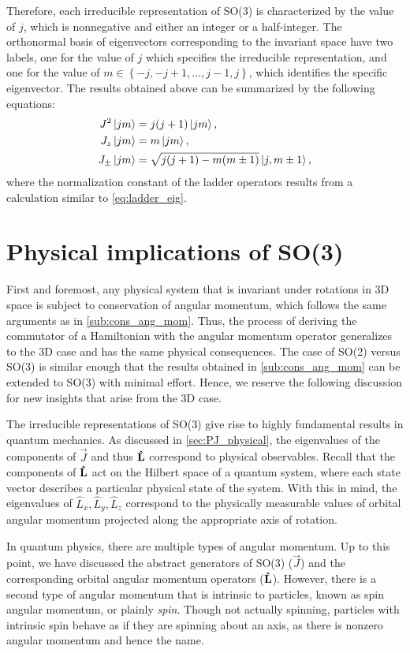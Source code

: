 Therefore, each irreducible representation of SO(3) is characterized by the value of $j$, which is nonnegative and either an integer or a half-integer. The orthonormal basis of eigenvectors corresponding to the invariant space have two labels, one for the value of $j$ which specifies the irreducible representation, and one for the value of $m\in\left\{ -j,-j+1,\dots,j-1,j \right\}$, which identifies the specific eigenvector. The results obtained above can be summarized by the following equations:
\begin{align}
    J^2\ket{jm} &= j(j+1)\ket{jm}, \\
    J_z\ket{jm} &= m\ket{jm}, \\
    J_\pm\ket{jm} &= \sqrt{j(j+1)-m(m\pm 1)}\ket{j,m\pm 1},
\end{align}
where the normalization constant of the ladder operators results from a calculation similar to \cref{eq:ladder_eig}.

\section{Physical implications of SO(3)}\label{sec:phys_SO3}
First and foremost, any physical system that is invariant under rotations in 3D space is subject to conservation of angular momentum, which follows the same arguments as in \cref{sub:cons_ang_mom}. Thus, the process of deriving the commutator of a Hamiltonian with the angular momentum operator generalizes to the 3D case and has the same physical consequences. The case of SO(2) versus SO(3) is similar enough that the results obtained in \cref{sub:cons_ang_mom} can be extended to SO(3) with minimal effort. Hence, we reserve the following discussion for new insights that arise from the 3D case.

The irreducible representations of SO(3) give rise to highly fundamental results in quantum mechanics. As discussed in \cref{sec:PJ_physical}, the eigenvalues of the components of $\vec{J}$ and thus $\mathbf{\hat{L}}$ correspond to physical observables. Recall that the components of $\mathbf{\hat{L}}$ act on the Hilbert space of a quantum system, where each state vector describes a particular physical state of the system. With this in mind, the eigenvalues of $\hat{L}_x, \hat{L}_y, \hat{L}_z$ correspond to the physically measurable values of orbital angular momentum projected along the appropriate axis of rotation.

In quantum physics, there are multiple types of angular momentum. Up to this point, we have discussed the abstract generators of SO(3) ($\vec{J}$) and the corresponding orbital angular momentum operators ($\mathbf{\hat{L}}$). However, there is a second type of angular momentum that is intrinsic to particles, known as spin angular momentum, or plainly \textit{spin}. Though not actually spinning, particles with intrinsic spin behave as if they are spinning about an axis, as there is nonzero angular momentum and hence the name.

